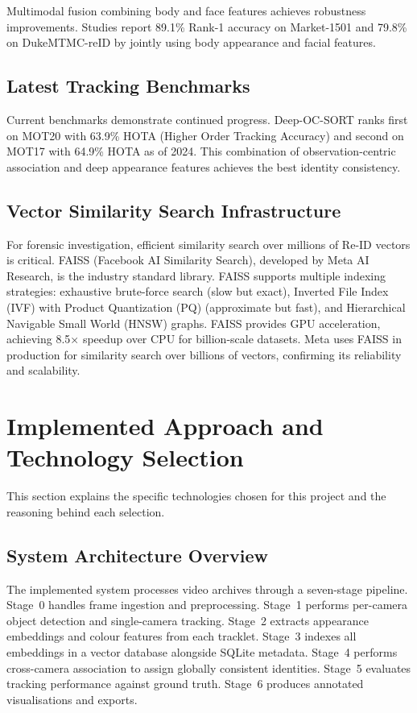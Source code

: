 Multimodal fusion combining body and face features achieves robustness improvements. Studies report 89.1\% Rank-1 accuracy on Market-1501 and 79.8\% on DukeMTMC-reID by jointly using body appearance and facial features.

\subsection{Latest Tracking Benchmarks}

Current benchmarks demonstrate continued progress. Deep-OC-SORT ranks first on MOT20 with 63.9\% HOTA (Higher Order Tracking Accuracy) and second on MOT17 with 64.9\% HOTA as of 2024. This combination of observation-centric association and deep appearance features achieves the best identity consistency.

\subsection{Vector Similarity Search Infrastructure}

For forensic investigation, efficient similarity search over millions of Re-ID vectors is critical. FAISS (Facebook AI Similarity Search), developed by Meta AI Research, is the industry standard library. FAISS supports multiple indexing strategies: exhaustive brute-force search (slow but exact), Inverted File Index (IVF) with Product Quantization (PQ) (approximate but fast), and Hierarchical Navigable Small World (HNSW) graphs. FAISS provides GPU acceleration, achieving 8.5× speedup over CPU for billion-scale datasets. Meta uses FAISS in production for similarity search over billions of vectors, confirming its reliability and scalability.

\section{Implemented Approach and Technology Selection}

This section explains the specific technologies chosen for this project and the reasoning behind each selection.

\subsection{System Architecture Overview}

The implemented system processes video archives through a seven-stage pipeline. Stage~0 handles frame ingestion and preprocessing. Stage~1 performs per-camera object detection and single-camera tracking. Stage~2 extracts appearance embeddings and colour features from each tracklet. Stage~3 indexes all embeddings in a vector database alongside SQLite metadata. Stage~4 performs cross-camera association to assign globally consistent identities. Stage~5 evaluates tracking performance against ground truth. Stage~6 produces annotated visualisations and exports.

